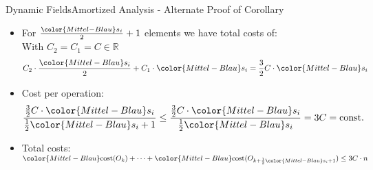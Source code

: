 \begin{frame}{Dynamic Fields}{Amortized Analysis - Alternate Proof of Corollary}
  \begin{itemize}
    \item
      For $\frac{\color{Mittel-Blau}s_i}{2} + 1$ elements we have total
      {\color{Mittel-Blau}costs} of:\\
      \hspace{1.5em}With $C_2 = C_1 = C \in \mathbb{R}$
      \begin{displaymath}
        C_2 \cdot \frac{\color{Mittel-Blau}s_i}{2}
        + C_1 \cdot {\color{Mittel-Blau}s_i}
        = \frac{3}{2} C \cdot {\color{Mittel-Blau}s_i}
      \end{displaymath}
    \item
      Cost per operation:
      \begin{displaymath}
        \frac{
          \frac{3}{2} C \cdot {\color{Mittel-Blau}s_i}
        }{
          \frac{1}{2}{\color{Mittel-Blau}s_i} + 1
        }
        \leq
        \frac{
          \frac{3}{2} C \cdot {\color{Mittel-Blau}s_i}
        }{
          \frac{1}{2}{\color{Mittel-Blau}s_i}
        }
        = 3 C = \text{const.}
      \end{displaymath}
    \item
      Total costs:
      \begin{math}
        {\color{Mittel-Blau}\mathrm{cost}(O_k)}+\dots+
        {\color{Mittel-Blau}
          \mathrm{cost}(O_{k+\frac{1}{2}{\color{Mittel-Blau}s_i} + 1})}
        \leq 3C \cdot n
      \end{math}
  \end{itemize}
\end{frame}


